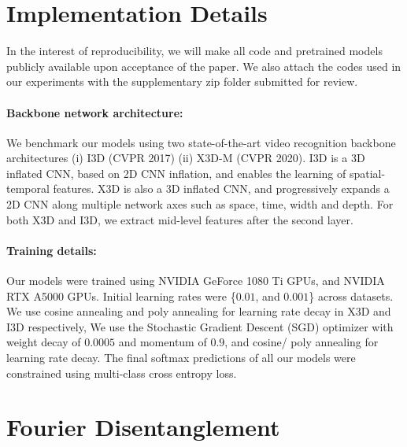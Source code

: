 \documentclass[runningheads]{llncs}
\begin{document}
\section{Implementation Details}

In the interest of reproducibility, we will make all code and pretrained models publicly available upon acceptance of the paper. We also attach the codes used in our experiments with the supplementary zip folder submitted for review. 

\label{exp:implementation}
\paragraph{Backbone network architecture:} We benchmark our models using two state-of-the-art video recognition backbone architectures (i) I3D \cite{carreira2017quo} (CVPR 2017) (ii) X3D-M \cite{feichtenhofer2020x3d} (CVPR 2020). I3D is a 3D inflated CNN, based on 2D CNN inflation, and enables the learning of spatial-temporal features. X3D is also a 3D inflated CNN, and progressively expands a 2D CNN along multiple network axes such as space, time, width and depth. 
For both X3D and I3D, we extract mid-level features after the second layer.

\paragraph{Training details:} Our models were trained using NVIDIA GeForce 1080 Ti GPUs, and NVIDIA RTX A5000 GPUs. Initial learning rates were \{$0.01$, and $0.001$\} across datasets. We use cosine annealing and poly annealing for learning rate decay in X3D and I3D respectively, 
We use the Stochastic Gradient Descent (SGD) optimizer with weight decay of $0.0005$ and momentum of $0.9$, and cosine/ poly annealing for learning rate decay. The final softmax predictions of all our models were constrained using multi-class cross entropy loss. 

\section{Fourier Disentanglement}
\end{document}
